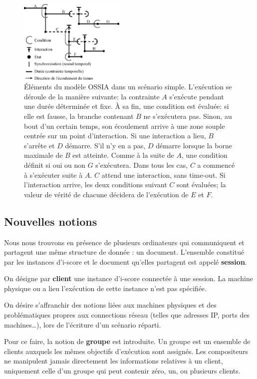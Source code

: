 \documentclass[10pt]{article}
\newcommand\ossia{OSSIA\xspace}
\newcommand\vocab[1]{\textbf{#1}}
\begin{document}
\begin{figure}[h]
    \centering
    \includegraphics[width=0.45\textwidth]{scenarios/iscore-example.eps}
    \caption{Éléments du modèle \ossia dans un scénario simple. L'exécution se déroule de la manière suivante: la contrainte $A$ s'exécute pendant une durée déterminée et fixe. À sa fin, une condition est évaluée: si elle est fausse, la branche contenant $B$ ne s'exécutera pas. Sinon, au bout d'un certain temps, son écoulement arrive à une zone souple centrée sur un point d'interaction. Si une interaction a lieu, $B$ s'arrête et $D$ démarre. S'il n'y en a pas, $D$ démarre lorsque la borne maximale de $B$ est atteinte. Comme à la suite de $A$, une condition définit si oui ou non $G$ s'exécutera. Dans tous les cas, $C$ a commencé à s'exécuter suite à $A$. $C$ attend une interaction, sans time-out. Si l'interaction arrive, les deux conditions suivant $C$ sont évaluées; la valeur de vérité de chacune décidera de l'exécution de $E$ et $F$. }
    \label{fig.ossia}
\end{figure}
\vspace{-0.5cm}
\subsection{Nouvelles notions}
Nous nous trouvons en présence de plusieurs ordinateurs qui communiquent et partagent une même structure de donnée : un document.
L'ensemble constitué par les instances d'i-score et le document qu'elles partagent est appelé \vocab{session}.

On désigne par \vocab{client} une instance d'i-score connectée à une session. 
La machine physique ou a lieu l'exécution de cette instance n'est pas spécifiée.

On désire s'affranchir des notions liées aux machines physiques et des problématiques propres aux connections réseau (telles que adresses IP, ports des machines\dots), lors de l'écriture d'un scénario réparti. 

Pour ce faire, la notion de \vocab{groupe} est introduite. 
Un groupe est un ensemble de clients auxquels les mêmes objectifs d'exécution sont assignés.
Les compositeurs ne manipulent jamais directement les informations relatives à un client, uniquement celle d'un groupe qui peut contenir zéro, un, ou plusieurs clients.
\end{document}
